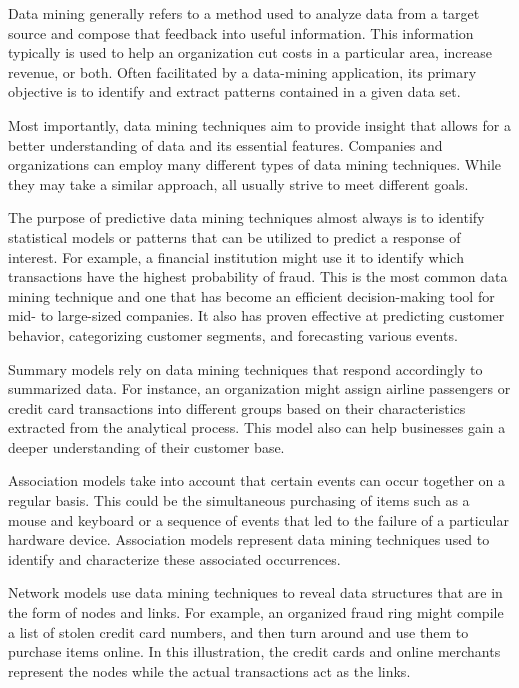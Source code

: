 \documentclass[11pt]{article} %
\begin{document}
Data mining generally refers to a method used to analyze data from a target source and compose that feedback into useful information. This information typically is used to help an organization cut costs in a particular area, increase revenue, or both. Often facilitated by a data-mining application, its primary objective is to identify and extract patterns contained in a given data set.



Most importantly, data mining techniques aim to provide insight that allows for a better understanding of data and its essential features. Companies and organizations can employ many different types of data mining techniques. While they may take a similar approach, all usually strive to meet different goals.



The purpose of predictive data mining techniques almost always is to identify statistical models or patterns that can be utilized to predict a response of interest. For example, a financial institution might use it to identify which transactions have the highest probability of fraud. This is the most common data mining technique and one that has become an efficient decision-making tool for mid- to large-sized companies. It also has proven effective at predicting customer behavior, categorizing customer segments, and forecasting various events.



Summary models rely on data mining techniques that respond accordingly to summarized data. For instance, an organization might assign airline passengers or credit card transactions into different groups based on their characteristics extracted from the analytical process. This model also can help businesses gain a deeper understanding of their customer base.



Association models take into account that certain events can occur together on a regular basis. This could be the simultaneous purchasing of items such as a mouse and keyboard or a sequence of events that led to the failure of a particular hardware device. Association models represent data mining techniques used to identify and characterize these associated occurrences.



Network models use data mining techniques to reveal data structures that are in the form of nodes and links. For example, an organized fraud ring might compile a list of stolen credit card numbers, and then turn around and use them to purchase items online. In this illustration, the credit cards and online merchants represent the nodes while the actual transactions act as the links.
\end{document}
